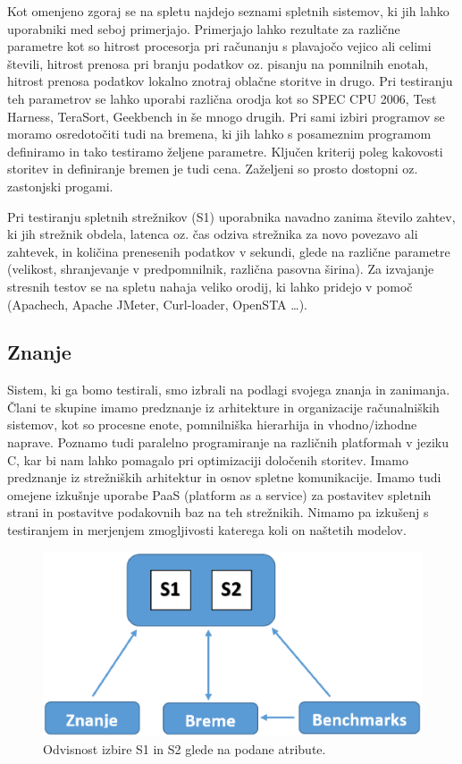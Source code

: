 Kot omenjeno zgoraj se na spletu najdejo seznami spletnih sistemov, ki jih lahko uporabniki med seboj primerjajo. Primerjajo lahko rezultate za različne parametre kot so hitrost procesorja pri računanju s plavajočo vejico ali celimi števili, hitrost prenosa pri branju podatkov oz. pisanju na pomnilnih enotah, hitrost prenosa podatkov lokalno znotraj oblačne storitve in drugo. Pri testiranju teh parametrov se lahko uporabi različna orodja kot so SPEC CPU 2006, Test Harness, TeraSort, Geekbench in še mnogo drugih. Pri sami izbiri programov se moramo osredotočiti tudi na bremena, ki jih lahko s posameznim programom definiramo in tako testiramo željene parametre. Ključen kriterij poleg kakovosti storitev in definiranje bremen je tudi cena. Zaželjeni so prosto dostopni oz. zastonjski progami. 

Pri testiranju spletnih strežnikov (S1) uporabnika navadno  zanima število zahtev, ki jih strežnik obdela, latenca oz. čas odziva strežnika za novo povezavo ali zahtevek, in količina prenesenih podatkov v sekundi, glede na različne parametre (velikost, shranjevanje v predpomnilnik, različna pasovna širina). Za izvajanje stresnih testov se na spletu nahaja veliko orodij, ki lahko pridejo v pomoč (Apachech, Apache JMeter, Curl-loader, OpenSTA …). 

\subsection{Znanje}

Sistem, ki ga bomo testirali, smo izbrali na podlagi svojega znanja in zanimanja. 
Člani te skupine imamo predznanje iz arhitekture in organizacije računalniških sistemov, kot so procesne enote, pomnilniška hierarhija in vhodno/izhodne naprave. Poznamo tudi paralelno programiranje na različnih platformah v jeziku C, kar bi nam lahko pomagalo pri optimizaciji določenih storitev. Imamo predznanje iz strežniških arhitektur in osnov spletne komunikacije. Imamo tudi omejene izkušnje uporabe PaaS (platform as a service) za postavitev spletnih strani in postavitve podakovnih baz na teh strežnikih. Nimamo pa izkušenj s testiranjem in merjenjem zmogljivosti katerega koli on naštetih modelov.

\begin{figure}[htbf]
\centerline{\includegraphics[scale=0.5]
{vzorec.eps}}
\caption{Odvisnost izbire S1 in S2 glede na podane atribute.}
\label{fig:miselni}
\end{figure}
